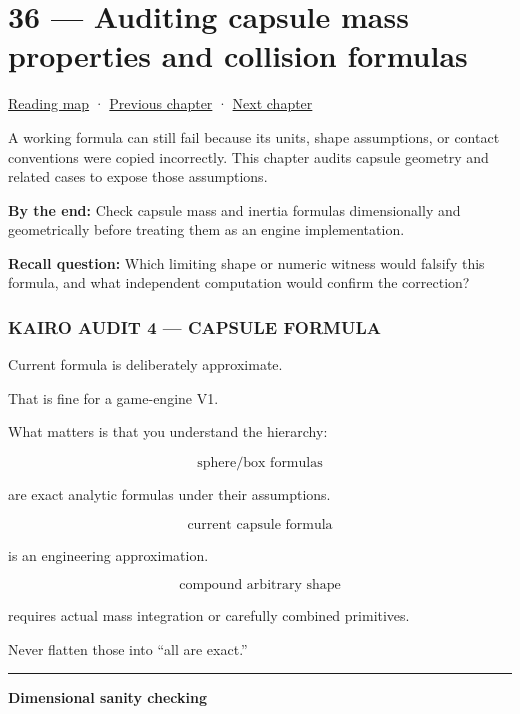 \hypertarget{06-engine-ii-ch036}{}
\section{36 --- Auditing capsule mass properties and collision formulas}\label{auditing-capsule-mass-properties-and-collision-formulas}

\href{Chapter\%20Edition/03\%20-\%20Game\%20Engine/00\%20-\%20Reading\%20Map}{Reading map} · \hyperref[06-engine-ii-ch035]{Previous chapter} · \hyperref[06-engine-ii-ch037]{Next chapter}

A working formula can still fail because its units, shape assumptions, or contact conventions were copied incorrectly. This chapter audits capsule geometry and related cases to expose those assumptions.

\textbf{By the end:} Check capsule mass and inertia formulas dimensionally and geometrically before treating them as an engine implementation.

\textbf{Recall question:} Which limiting shape or numeric witness would falsify this formula, and what independent computation would confirm the correction?

\subsubsection{KAIRO AUDIT 4 --- CAPSULE FORMULA}\label{kairo-audit-4-capsule-formula}

Current formula is deliberately approximate.

That is fine for a game-engine V1.

What matters is that you understand the hierarchy:

\[
\text{sphere/box formulas}
\]

are exact analytic formulas under their assumptions.

\[
\text{current capsule formula}
\]

is an engineering approximation.

\[
\text{compound arbitrary shape}
\]

requires actual mass integration or carefully combined primitives.

Never flatten those into ``all are exact.''

\begin{center}\rule{0.5\linewidth}{0.5pt}\end{center}

\textbf{Dimensional sanity checking}

